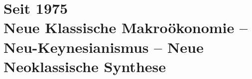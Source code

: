 %
%
%


\part{Seit 1975\\Neue Klassische Makroökonomie -- Neu-Keynesianismus -- Neue Neoklassische Synthese}
